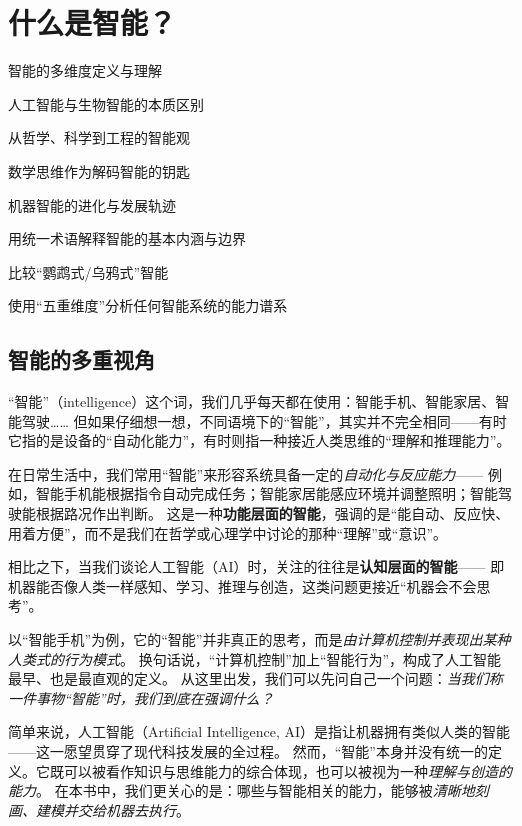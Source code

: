 \chapter{ 什么是智能？}
 \begin{introduction}
  \item 智能的多维度定义与理解
  \item 人工智能与生物智能的本质区别
  \item 从哲学、科学到工程的智能观
  \item 数学思维作为解码智能的钥匙
  \item 机器智能的进化与发展轨迹
\end{introduction}

\begin{introduction}
  \item 用统一术语解释智能的基本内涵与边界
  \item 比较“鹦鹉式/乌鸦式”智能
  \item 使用“五重维度”分析任何智能系统的能力谱系
\end{introduction}

\section{智能的多重视角}

“智能”（intelligence）这个词，我们几乎每天都在使用：智能手机、智能家居、智能驾驶……  
但如果仔细想一想，不同语境下的“智能”，其实并不完全相同——有时它指的是设备的“自动化能力”，有时则指一种接近人类思维的“理解和推理能力”。  

在日常生活中，我们常用“智能”来形容系统具备一定的\emph{自动化与反应能力}——  
例如，智能手机能根据指令自动完成任务；智能家居能感应环境并调整照明；智能驾驶能根据路况作出判断。  
这是一种\textbf{功能层面的智能}，强调的是“能自动、反应快、用着方便”，而不是我们在哲学或心理学中讨论的那种“理解”或“意识”。  

相比之下，当我们谈论人工智能（AI）时，关注的往往是\textbf{认知层面的智能}——  
即机器能否像人类一样感知、学习、推理与创造，这类问题更接近“机器会不会思考”。  

以“智能手机”为例，它的“智能”并非真正的思考，而是\emph{由计算机控制并表现出某种人类式的行为模式}。  
换句话说，“计算机控制”加上“智能行为”，构成了人工智能最早、也是最直观的定义。  
从这里出发，我们可以先问自己一个问题：\emph{当我们称一件事物“智能”时，我们到底在强调什么？}  
 
简单来说，人工智能（Artificial Intelligence, AI）是指让机器拥有类似人类的智能——这一愿望贯穿了现代科技发展的全过程。 
然而，“智能”本身并没有统一的定义。它既可以被看作知识与思维能力的综合体现，也可以被视为一种\emph{理解与创造的能力}。  
在本书中，我们更关心的是：哪些与智能相关的能力，能够被\emph{清晰地刻画、建模并交给机器去执行}。  

